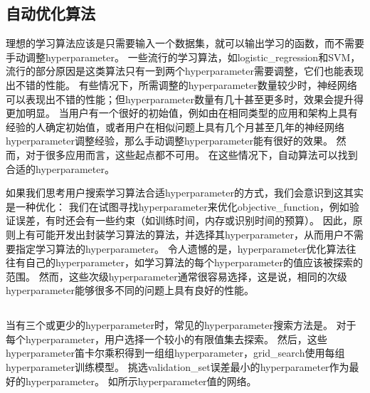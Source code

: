 \subsection{自动优化算法}
\label{sec:automatic_hyperparameter_optimization_algorithms}
理想的学习算法应该是只需要输入一个数据集，就可以输出学习的函数，而不需要手动调整\gls{hyperparameter}。
一些流行的学习算法，如\gls{logistic_regression}和\gls{SVM}，流行的部分原因是这类算法只有一到两个\gls{hyperparameter}需要调整，它们也能表现出不错的性能。
有些情况下，所需调整的\gls{hyperparameter}数量较少时，神经网络可以表现出不错的性能；但\gls{hyperparameter}数量有几十甚至更多时，效果会提升得更加明显。
当用户有一个很好的初始值，例如由在相同类型的应用和架构上具有经验的人确定初始值，或者用户在相似问题上具有几个月甚至几年的神经网络\gls{hyperparameter}调整经验，那么手动调整\gls{hyperparameter}能有很好的效果。%
然而，对于很多应用而言，这些起点都不可用。
在这些情况下，自动算法可以找到合适的\gls{hyperparameter}。


如果我们思考用户搜索学习算法合适\gls{hyperparameter}的方式，我们会意识到这其实是一种优化：
我们在试图寻找\gls{hyperparameter}来优化\gls{objective_function}，例如验证误差，有时还会有一些约束（如训练时间，内存或识别时间的预算）。
因此，原则上有可能开发出封装学习算法的算法，并选择其\gls{hyperparameter}，从而用户不需要指定学习算法的\gls{hyperparameter}。
令人遗憾的是，\gls{hyperparameter}优化算法往往有自己的\gls{hyperparameter}，如学习算法的每个\gls{hyperparameter}的值应该被探索的范围。
然而，这些次级\gls{hyperparameter}通常很容易选择，这是说，相同的次级\gls{hyperparameter}能够很多不同的问题上具有良好的性能。


\subsection{}
\label{sec:grid_search}
当有三个或更少的\gls{hyperparameter}时，常见的\gls{hyperparameter}搜索方法是。
对于每个\gls{hyperparameter}，用户选择一个较小的有限值集去探索。
然后，这些\gls{hyperparameter}笛卡尔乘积得到一组组\gls{hyperparameter}，\gls{grid_search}使用每组\gls{hyperparameter}训练模型。
挑选\gls{validation_set}误差最小的\gls{hyperparameter}作为最好的\gls{hyperparameter}。
如所示\gls{hyperparameter}值的网络。


